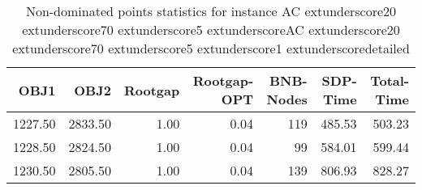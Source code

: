 \begin{table}
\caption{Non-dominated points statistics for instance AC	extunderscore20	extunderscore70	extunderscore5	extunderscoreAC	extunderscore20	extunderscore70	extunderscore5	extunderscore1	extunderscoredetailed}
\label{tab:stats/AC_20_70_5_AC_20_70_5_1_detailed}
\begin{tabular}{rrrrrrr}
\toprule
OBJ1 & OBJ2 & Rootgap & Rootgap-OPT & BNB-Nodes & SDP-Time & Total-Time \\
\midrule
1227.50 & 2833.50 & 1.00 & 0.04 & 119 & 485.53 & 503.23 \\
1228.50 & 2824.50 & 1.00 & 0.04 & 99 & 584.01 & 599.44 \\
1230.50 & 2805.50 & 1.00 & 0.04 & 139 & 806.93 & 828.27 \\
\bottomrule
\end{tabular}
\end{table}

